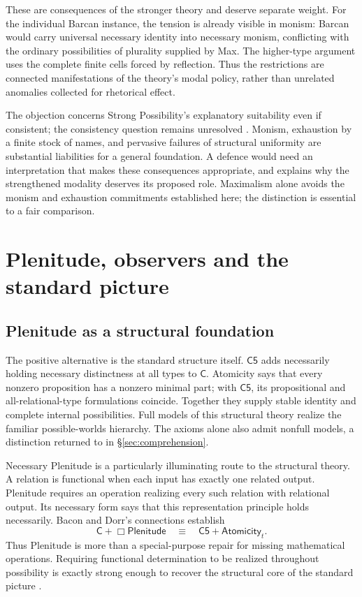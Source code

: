 \documentclass[12pt,letterpaper]{article}
\newcommand{\C}{\mathsf C}
\newcommand{\Cfive}{\mathsf{C5}}
\newcommand{\Plen}{\mathsf{Plenitude}}
\newcommand{\At}{\mathsf{Atomicity}}
\begin{document}
These are consequences of the stronger theory and deserve separate weight. For the individual Barcan instance, the tension is already visible in monism: Barcan would carry universal necessary identity into necessary monism, conflicting with the ordinary possibilities of plurality supplied by Max. The higher-type argument uses the complete finite cells forced by reflection. Thus the restrictions are connected manifestations of the theory's modal policy, rather than unrelated anomalies collected for rhetorical effect.

The objection concerns Strong Possibility's explanatory suitability even if consistent; the consistency question remains unresolved \citep[\S5]{spcore}. Monism, exhaustion by a finite stock of names, and pervasive failures of structural uniformity are substantial liabilities for a general foundation. A defence would need an interpretation that makes these consequences appropriate, and explains why the strengthened modality deserves its proposed role. Maximalism alone avoids the monism and exhaustion commitments established here; the distinction is essential to a fair comparison.

\section{Plenitude, observers and the standard picture}\label{sec:observation}

\subsection{Plenitude as a structural foundation}

The positive alternative is the standard structure itself. $\Cfive$ adds necessarily holding necessary distinctness at all types to $\C$. Atomicity says that every nonzero proposition has a nonzero minimal part; with $\Cfive$, its propositional and all-relational-type formulations coincide. Together they supply stable identity and complete internal possibilities. Full models of this structural theory realize the familiar possible-worlds hierarchy. The axioms alone also admit nonfull models, a distinction returned to in \S\ref{sec:comprehension}.

Necessary Plenitude is a particularly illuminating route to the structural theory. A relation is functional when each input has exactly one related output. Plenitude requires an operation realizing every such relation with relational output. Its necessary form says that this representation principle holds necessarily. Bacon and Dorr's connections establish
\[
 \C+\Box\Plen\quad\equiv\quad\Cfive+\At_t.
\]
Thus Plenitude is more than a special-purpose repair for missing mathematical operations. Requiring functional determination to be realized throughout possibility is exactly strong enough to recover the structural core of the standard picture \citep[\S2.3, concluding equivalences]{bacondorr}.
\end{document}
